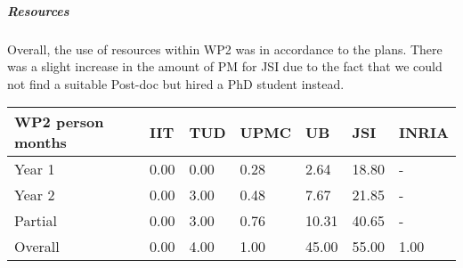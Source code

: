 \subparagraph{Resources}
Overall, the use of resources within WP2 was in accordance to the plans. There was a slight increase in the amount of PM for JSI due to the fact that we could not find a suitable Post-doc but hired a PhD student instead.

\begin{center}
\begin{tabular}{|C{1.5cm}|C{1.5cm}|C{1.5cm}|C{2cm}|C{2cm}|C{2cm}|C{2cm}|}
\hline
\footnotesize \textbf{WP2 person months}& \footnotesize \textbf{IIT}&\footnotesize \textbf{TUD}&\footnotesize \textbf{UPMC}& \footnotesize \textbf{UB} &\footnotesize \textbf{JSI} & \footnotesize \textbf{INRIA} \\ \hline
\footnotesize Year 1 &  0.00     & 0.00 & 0.28 & 2.64 & 18.80  &-  \\  \hline
\footnotesize Year 2 &  0.00     & 3.00 & 0.48 & 7.67 & 21.85  &-  \\  \hline
\footnotesize Partial &  0.00     & 3.00 & 0.76 & 10.31 & 40.65 & - \\ \hline \hline
\footnotesize Overall & 0.00     & 4.00 & 1.00 & 45.00 & 55.00 & 1.00 \\ \hline
\end{tabular}
\end{center}
